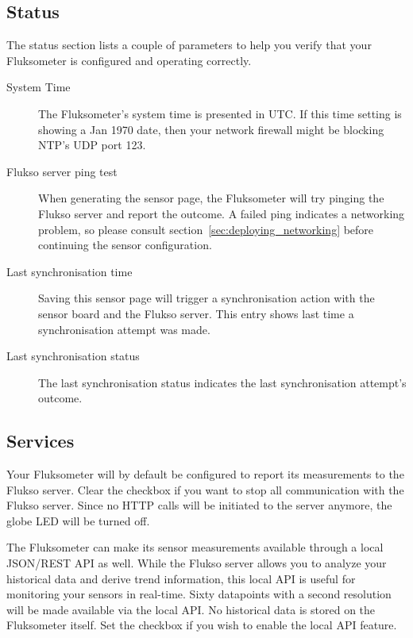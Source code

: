 \subsection{Status}
The status section lists a couple of parameters to help you verify that your Fluksometer is configured and operating correctly.

\begin{description}

\item[System Time] The Fluksometer's system time is presented in UTC. If this time setting is showing a Jan 1970 date, then your network firewall might be blocking NTP's UDP port 123.

\item[Flukso server ping test] When generating the sensor page, the Fluksometer will try pinging the Flukso server and report the outcome. A failed ping indicates a networking problem, so please consult section~\ref{sec:deploying_networking} before continuing the sensor configuration.

\item[Last synchronisation time] Saving this sensor page will trigger a synchronisation action with the sensor board and the Flukso server. This entry shows last time a synchronisation attempt was made.

\item[Last synchronisation status] The last synchronisation status indicates the last synchronisation attempt's outcome.

\end{description}

\subsection{Services}
Your Fluksometer will by default be configured to report its measurements to the Flukso server. Clear the checkbox if you want to stop all communication with the Flukso server. Since no HTTP calls will be initiated to the server anymore, the globe LED will be turned off.

The Fluksometer can make its sensor measurements available through a local JSON/REST API as well. While the Flukso server allows you to analyze your historical data and derive trend information, this local API is useful for monitoring your sensors in real-time. Sixty datapoints with a second resolution will be made available via the local API. No historical data is stored on the Fluksometer itself. Set the checkbox if you wish to enable the local API feature.

